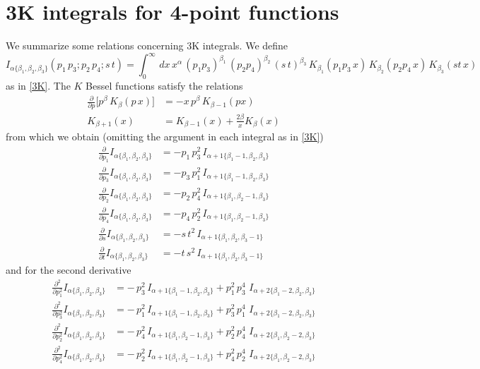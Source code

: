 \documentclass[a4paper,11pt,openright,twoside]{book}
\let\a=\alpha   \let\b=\beta   \let\g=\gamma   \let\d=\delta
\numberwithin{equation}{section}
\begin{document}
{{\section{3K integrals for 4-point functions}\label{AppendixA}
We summarize some relations concerning 3K integrals. We define 
\begin{equation}
	I_{\a\{\b_1,\b_2,\b_3\}}(p_1\,p_3; p_2\,p_4;s\,t)=\int_0^\infty\,dx\,x^\a\,(p_1p_3)^{\b_1}\,(p_2p_4)^{\b_2}\,(s\,t)^{\b_3}\,K_{\b_1}(p_1p_3\,x)\,K_{\b_2}(p_2p_4\,x)\,K_{\b_3}(st\,x)
\end{equation}
as in \eqref{3K}. The $K$ Bessel functions satisfy the relations
\begin{align}
	\frac{\partial}{\partial p}\big[p^\b\,K_\b(p\,x)\big]&=-x\,p^\b\,K_{\b-1}(p x)\\
	K_{\b+1}(x)&=K_{\b-1}(x)+\frac{2\b}{x}K_{\b}(x)
\end{align}
from which we obtain (omitting the argument in each integral as in \eqref{3K}) 
\begin{align}
	\frac{\partial}{\partial p_1}I_{\a\{\b_1,\b_2,\b_3\}}&=-p_1\,p_3^2\,I_{\a+1\{\b_1-1,\b_2,\b_3\}}\\
	\frac{\partial}{\partial p_3}I_{\a\{\b_1,\b_2,\b_3\}}&=-p_3\,p_1^2\,I_{\a+1\{\b_1-1,\b_2,\b_3\}}\\
	\frac{\partial}{\partial p_2}I_{\a\{\b_1,\b_2,\b_3\}}&=-p_2\,p_4^2\,I_{\a+1\{\b_1,\b_2-1,\b_3\}}\\
	\frac{\partial}{\partial p_4}I_{\a\{\b_1,\b_2,\b_3\}}&=-p_4\,p_2^2\,I_{\a+1\{\b_1,\b_2-1,\b_3\}}\\
	\frac{\partial}{\partial s}I_{\a\{\b_1,\b_2,\b_3\}}&=-s\,t^2\,I_{\a+1\{\b_1,\b_2,\b_3-1\}}\\
	\frac{\partial}{\partial t}I_{\a\{\b_1,\b_2,\b_3\}}&=-t\,s^2\,I_{\a+1\{\b_1,\b_2,\b_3-1\}}
\end{align}
and for the second derivative
\begin{align}
	\frac{\partial^2}{\partial p_1^2}I_{\a\{\b_1,\b_2,\b_3\}}&=-\,p_3^2\,I_{\a+1\{\b_1-1,\b_2,\b_3\}}+p_1^2\,p_3^4\,\,I_{\a+2\{\b_1-2,\b_2,\b_3\}}\\
	\frac{\partial^2}{\partial p_3^2}I_{\a\{\b_1,\b_2,\b_3\}}&=-\,p_1^2\,I_{\a+1\{\b_1-1,\b_2,\b_3\}}+p_3^2\,p_1^4\,\,I_{\a+2\{\b_1-2,\b_2,\b_3\}}\\
	\frac{\partial^2}{\partial p_2^2}I_{\a\{\b_1,\b_2,\b_3\}}&=-\,p_4^2\,I_{\a+1\{\b_1,\b_2-1,\b_3\}}+p_2^2\,p_4^4\,\,I_{\a+2\{\b_1,\b_2-2,\b_3\}}\\
	\frac{\partial^2}{\partial p_4^2}I_{\a\{\b_1,\b_2,\b_3\}}&=-\,p_2^2\,I_{\a+1\{\b_1,\b_2-1,\b_3\}}+p_4^2\,p_2^4\,\,I_{\a+2\{\b_1,\b_2-2,\b_3\}}\\

\end{align}}}
\end{document}
